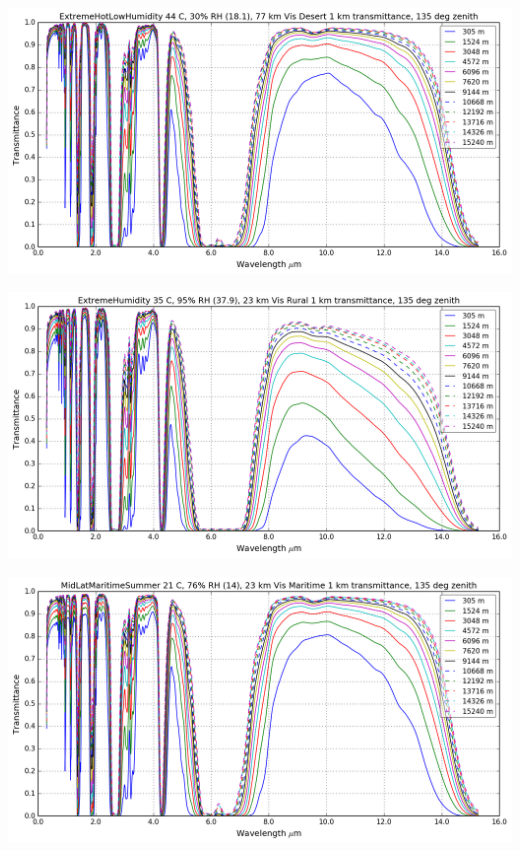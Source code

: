 \documentclass{workpackage}
\begin{document}
\begin{center}
\includegraphics{./pic/Analyse-Standard-Atmospheres_17_1.png}
\end{center}

\begin{center}
\includegraphics{./pic/Analyse-Standard-Atmospheres_17_2.png}
\end{center}

\begin{center}
\includegraphics{./pic/Analyse-Standard-Atmospheres_17_3.png}
\end{center}
\end{document}
